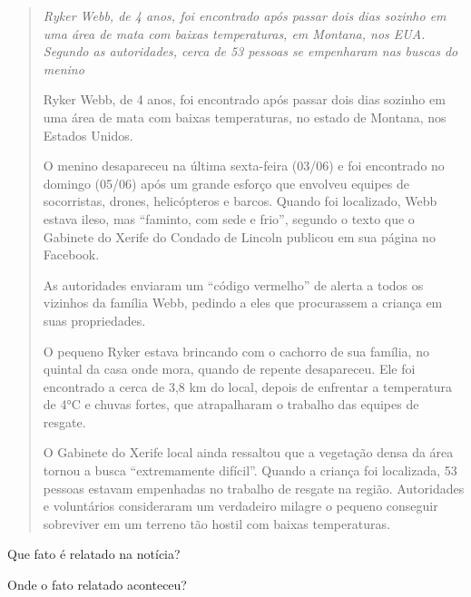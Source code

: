 \begin{escolha}
\begin{escolha}
\begin{quote}
\emph{Ryker Webb, de 4 anos, foi encontrado após passar dois dias
sozinho em uma área de mata com baixas temperaturas, em Montana, nos
EUA. Segundo as autoridades, cerca de 53 pessoas se empenharam nas
buscas do menino}

Ryker Webb, de 4 anos, foi encontrado após passar dois dias sozinho em
uma área de mata com baixas temperaturas, no estado de Montana, nos
Estados Unidos.

O menino desapareceu na última sexta-feira (03/06) e foi encontrado no
domingo (05/06) após um grande esforço que envolveu equipes de
socorristas, drones, helicópteros e barcos. Quando foi localizado, Webb
estava ileso, mas ``faminto, com sede e frio'', segundo o texto que o
Gabinete do Xerife do Condado de Lincoln publicou em sua página no
Facebook.

As autoridades enviaram um ``código vermelho'' de alerta a todos os
vizinhos da família Webb, pedindo a eles que procurassem a criança em
suas propriedades.

O pequeno Ryker estava brincando com o cachorro de sua família, no
quintal da casa onde mora, quando de repente desapareceu. Ele foi
encontrado a cerca de 3,8 km do local, depois de enfrentar a temperatura
de 4°C e chuvas fortes, que atrapalharam o trabalho das equipes de
resgate.

O Gabinete do Xerife local ainda ressaltou que a vegetação densa da área
tornou a busca ``extremamente difícil''. Quando a criança foi
localizada, 53 pessoas estavam empenhadas no trabalho
de resgate na
região. Autoridades e voluntários consideraram um verdadeiro milagre o
pequeno conseguir sobreviver em um terreno tão hostil com baixas
temperaturas.
\end{quote}


\begin{escolha}
\item Que fato é relatado na notícia?


\item Onde o fato relatado aconteceu?



\end{escolha}
\end{escolha}
\end{escolha}
